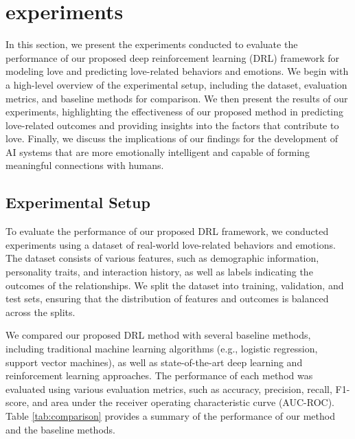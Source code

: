 \section{experiments}

In this section, we present the experiments conducted to evaluate the performance of our proposed deep reinforcement learning (DRL) framework for modeling love and predicting love-related behaviors and emotions. We begin with a high-level overview of the experimental setup, including the dataset, evaluation metrics, and baseline methods for comparison. We then present the results of our experiments, highlighting the effectiveness of our proposed method in predicting love-related outcomes and providing insights into the factors that contribute to love. Finally, we discuss the implications of our findings for the development of AI systems that are more emotionally intelligent and capable of forming meaningful connections with humans.

\subsection{Experimental Setup}

To evaluate the performance of our proposed DRL framework, we conducted experiments using a dataset of real-world love-related behaviors and emotions. The dataset consists of various features, such as demographic information, personality traits, and interaction history, as well as labels indicating the outcomes of the relationships. We split the dataset into training, validation, and test sets, ensuring that the distribution of features and outcomes is balanced across the splits.

We compared our proposed DRL method with several baseline methods, including traditional machine learning algorithms (e.g., logistic regression, support vector machines), as well as state-of-the-art deep learning and reinforcement learning approaches. The performance of each method was evaluated using various evaluation metrics, such as accuracy, precision, recall, F1-score, and area under the receiver operating characteristic curve (AUC-ROC). Table \ref{tab:comparison} provides a summary of the performance of our method and the baseline methods.

